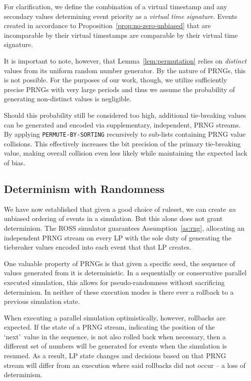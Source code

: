 \documentclass[nonacm,sigconf]{acmart}
\begin{document}
For clarification, we define the combination of a virtual timestamp and any secondary values determining event priority as a \emph{virtual time signature}. Events created in accordance to Proposition~\ref{prop:no-zero-unbiased} that are incomparable by their virtual timestamps are comparable by their virtual time signature.

It is important to note, however, that Lemma~\ref{lem:permutation} relies on \emph{distinct} values from its uniform random number generator. By the nature of PRNGs, this is not possible. For the purposes of our work, though, we utilize sufficiently precise PRNGs with very large periods and thus we assume the probability of generating non-distinct values is negligible. 

Should this probability still be considered too high, additional tie-breaking values can be generated and encoded via supplementary, independent, PRNG streams. By applying \texttt{PERMUTE-BY-SORTING} recursively to sub-lists containing PRNG value collisions. This effectively increases the bit precision of the primary tie-breaking value, making overall collision even less likely while maintaining the expected lack of bias.

\subsection{Determinism with Randomness} \label{sec:random-determinism}
We have now established that given a good choice of ruleset, we can create \emph{an} unbiased ordering of events in a simulation. But this alone does not grant determinism. The ROSS simulator guarantees Assumption~\ref{as:rng}, allocating an independent PRNG stream on every LP with the sole duty of generating the tiebreaker values encoded into each event that that LP creates.

One valuable property of PRNGs is that given a specific seed, the sequence of values generated from it is deterministic. In a sequentially or conservative parallel executed simulation, this allows for pseudo-randomness without sacrificing determinism. In neither of these execution modes is there ever a rollback to a previous simulation state.

When executing a parallel simulation optimistically, however, rollbacks are expected. If the state of a PRNG stream, indicating the position of the \lq next\rq~value in the sequence, is not also rolled back when necessary, then a different set of numbers will be generated for events when the simulation is resumed. As a result, LP state changes and decisions based on that PRNG stream will differ from an execution where said rollbacks did not occur -- a loss of determinism.
\end{document}
